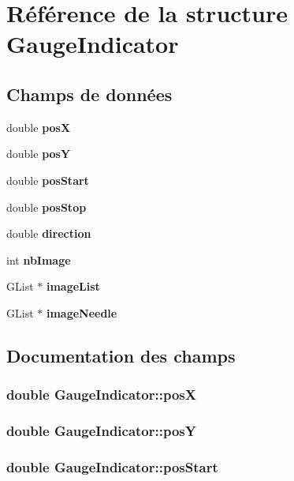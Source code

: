 \section{Référence de la structure GaugeIndicator}
\label{structGaugeIndicator}
\subsection*{Champs de données}
\begin{CompactItemize}
\item 
double {\bf posX}
\item 
double {\bf posY}
\item 
double {\bf posStart}
\item 
double {\bf posStop}
\item 
double {\bf direction}
\item 
int {\bf nbImage}
\item 
GList $\ast$ {\bf imageList}
\item 
GList $\ast$ {\bf imageNeedle}
\end{CompactItemize}


\subsection{Documentation des champs}
\subsubsection{\setlength{\rightskip}{0pt plus 5cm}double {\bf GaugeIndicator::posX}}\label{structGaugeIndicator_80bf2f33426c955a04760d1727b297ec}


\subsubsection{\setlength{\rightskip}{0pt plus 5cm}double {\bf GaugeIndicator::posY}}\label{structGaugeIndicator_e899602837be602af82cb8a0dd8a0dd3}


\subsubsection{\setlength{\rightskip}{0pt plus 5cm}double {\bf GaugeIndicator::posStart}}\label{structGaugeIndicator_e5c04dfbce162124810cb79486a2b521}


